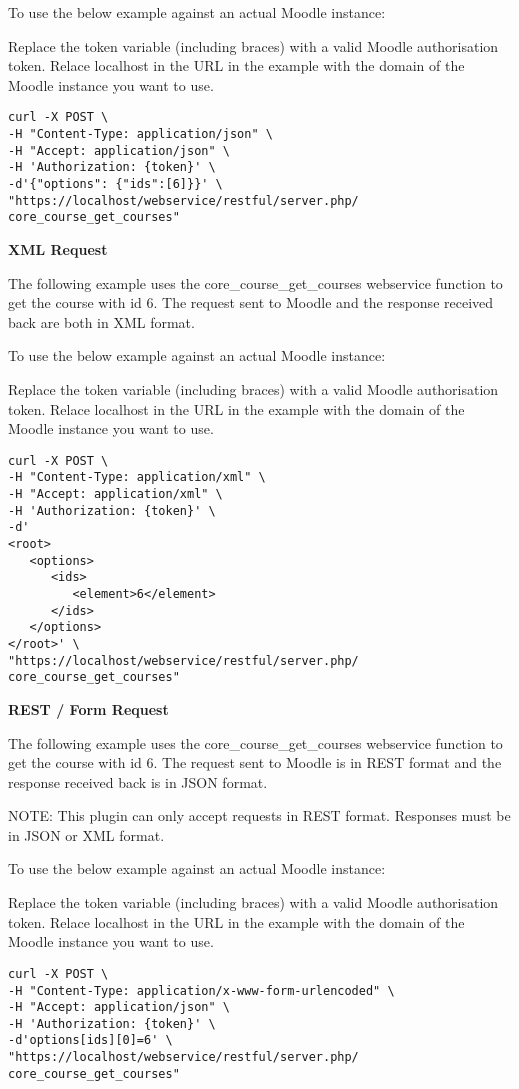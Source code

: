 To use the below example against an actual Moodle instance:

Replace the {token} variable (including braces) with a valid Moodle authorisation token.
Relace localhost in the URL in the example with the domain of the Moodle instance you want to use.

\begin{verbatim}
curl -X POST \
-H "Content-Type: application/json" \
-H "Accept: application/json" \
-H 'Authorization: {token}' \
-d'{"options": {"ids":[6]}}' \
"https://localhost/webservice/restful/server.php/ core_course_get_courses"
\end{verbatim}

\textbf{XML Request}

The following example uses the core\_course\_get\_courses webservice function to get the course with id 6. The request sent to Moodle and the response received back are both in XML format.

To use the below example against an actual Moodle instance:

Replace the {token} variable (including braces) with a valid Moodle authorisation token.
Relace localhost in the URL in the example with the domain of the Moodle instance you want to use.

\begin{verbatim}
curl -X POST \
-H "Content-Type: application/xml" \
-H "Accept: application/xml" \
-H 'Authorization: {token}' \
-d'
<root>
   <options>
      <ids>
         <element>6</element>
      </ids>
   </options>
</root>' \
"https://localhost/webservice/restful/server.php/ core_course_get_courses"
\end{verbatim}

\textbf{REST / Form Request}

The following example uses the core\_course\_get\_courses webservice function to get the course with id 6. The request sent to Moodle is in REST format and the response received back is in JSON format.

NOTE: This plugin can only accept requests in REST format. Responses must be in JSON or XML format.

To use the below example against an actual Moodle instance:

Replace the {token} variable (including braces) with a valid Moodle authorisation token.
Relace localhost in the URL in the example with the domain of the Moodle instance you want to use.

\begin{verbatim}
curl -X POST \
-H "Content-Type: application/x-www-form-urlencoded" \
-H "Accept: application/json" \
-H 'Authorization: {token}' \
-d'options[ids][0]=6' \
"https://localhost/webservice/restful/server.php/ core_course_get_courses"
\end{verbatim}

